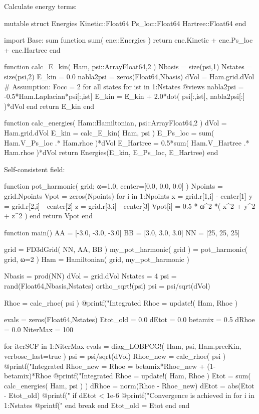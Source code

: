 Calculate energy terms:
\begin{juliacode}
mutable struct Energies
  Kinetic::Float64
  Ps_loc::Float64
  Hartree::Float64
end

import Base: sum
function sum( ene::Energies )
  return ene.Kinetic + ene.Ps_loc + ene.Hartree
end

function calc_E_kin( Ham, psi::Array{Float64,2} )
  Nbasis = size(psi,1)
  Nstates = size(psi,2)
  E_kin = 0.0
  nabla2psi = zeros(Float64,Nbasis)
  dVol = Ham.grid.dVol
  # Assumption: Focc = 2 for all states
  for ist in 1:Nstates
    @views nabla2psi = -0.5*Ham.Laplacian*psi[:,ist]
    E_kin = E_kin + 2.0*dot( psi[:,ist], nabla2psi[:] )*dVol
  end
  return E_kin
end

function calc_energies( Ham::Hamiltonian, psi::Array{Float64,2} )
  dVol = Ham.grid.dVol
  E_kin = calc_E_kin( Ham, psi )
  E_Ps_loc = sum( Ham.V_Ps_loc .* Ham.rhoe )*dVol
  E_Hartree = 0.5*sum( Ham.V_Hartree .* Ham.rhoe )*dVol
  return Energies(E_kin, E_Ps_loc, E_Hartree)
end
\end{juliacode}

Self-consistent field:
\begin{juliacode}
function pot_harmonic( grid; ω=1.0, center=[0.0, 0.0, 0.0] )
  Npoints = grid.Npoints
  Vpot = zeros(Npoints)
  for i in 1:Npoints
    x = grid.r[1,i] - center[1]
    y = grid.r[2,i] - center[2]
    z = grid.r[3,i] - center[3]
    Vpot[i] = 0.5 * ω^2 *( x^2 + y^2 + z^2 )
  end
  return Vpot
end

function main()
  AA = [-3.0, -3.0, -3.0]
  BB = [3.0, 3.0, 3.0]
  NN = [25, 25, 25]

  grid = FD3dGrid( NN, AA, BB )
  my_pot_harmonic( grid ) = pot_harmonic( grid, ω=2 )
  Ham = Hamiltonian( grid, my_pot_harmonic )

  Nbasis = prod(NN)
  dVol = grid.dVol
  Nstates = 4
  psi = rand(Float64,Nbasis,Nstates)
  ortho_sqrt!(psi)
  psi = psi/sqrt(dVol)

  Rhoe = calc_rhoe( psi )
  @printf("Integrated Rhoe = %
  update!( Ham, Rhoe )

  evals = zeros(Float64,Nstates)
  Etot_old = 0.0
  dEtot = 0.0
  betamix = 0.5
  dRhoe = 0.0
  NiterMax = 100

  for iterSCF in 1:NiterMax
    evals = diag_LOBPCG!( Ham, psi, Ham.precKin, verbose_last=true )
    psi = psi/sqrt(dVol)
    Rhoe_new = calc_rhoe( psi )
    @printf("Integrated Rhoe_new = %
    Rhoe = betamix*Rhoe_new + (1-betamix)*Rhoe
    @printf("Integrated Rhoe     = %
    update!( Ham, Rhoe )
    Etot = sum( calc_energies( Ham, psi ) )
    dRhoe = norm(Rhoe - Rhoe_new)
    dEtot = abs(Etot - Etot_old)
    @printf("%
    if dEtot < 1e-6
      @printf("Convergence is achieved in %
      for i in 1:Nstates
        @printf("%
      end
      break
    end
    Etot_old = Etot
  end
end
\end{juliacode}

